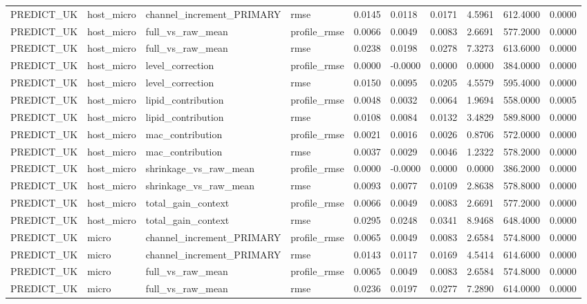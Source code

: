 {\begin{longtable}{llllllllll}
PREDICT\_UK & host\_micro & channel\_increment\_PRIMARY & rmse & 0.0145 & 0.0118 & 0.0171 & 4.5961 & 612.4000 & 0.0000 \\
PREDICT\_UK & host\_micro & full\_vs\_raw\_mean & profile\_rmse & 0.0066 & 0.0049 & 0.0083 & 2.6691 & 577.2000 & 0.0000 \\
PREDICT\_UK & host\_micro & full\_vs\_raw\_mean & rmse & 0.0238 & 0.0198 & 0.0278 & 7.3273 & 613.6000 & 0.0000 \\
PREDICT\_UK & host\_micro & level\_correction & profile\_rmse & 0.0000 & -0.0000 & 0.0000 & 0.0000 & 384.0000 & 0.0000 \\
PREDICT\_UK & host\_micro & level\_correction & rmse & 0.0150 & 0.0095 & 0.0205 & 4.5579 & 595.4000 & 0.0000 \\
PREDICT\_UK & host\_micro & lipid\_contribution & profile\_rmse & 0.0048 & 0.0032 & 0.0064 & 1.9694 & 558.0000 & 0.0005 \\
PREDICT\_UK & host\_micro & lipid\_contribution & rmse & 0.0108 & 0.0084 & 0.0132 & 3.4829 & 589.8000 & 0.0000 \\
PREDICT\_UK & host\_micro & mac\_contribution & profile\_rmse & 0.0021 & 0.0016 & 0.0026 & 0.8706 & 572.0000 & 0.0000 \\
PREDICT\_UK & host\_micro & mac\_contribution & rmse & 0.0037 & 0.0029 & 0.0046 & 1.2322 & 578.2000 & 0.0000 \\
PREDICT\_UK & host\_micro & shrinkage\_vs\_raw\_mean & profile\_rmse & 0.0000 & -0.0000 & 0.0000 & 0.0000 & 386.2000 & 0.0000 \\
PREDICT\_UK & host\_micro & shrinkage\_vs\_raw\_mean & rmse & 0.0093 & 0.0077 & 0.0109 & 2.8638 & 578.8000 & 0.0000 \\
PREDICT\_UK & host\_micro & total\_gain\_context & profile\_rmse & 0.0066 & 0.0049 & 0.0083 & 2.6691 & 577.2000 & 0.0000 \\
PREDICT\_UK & host\_micro & total\_gain\_context & rmse & 0.0295 & 0.0248 & 0.0341 & 8.9468 & 648.4000 & 0.0000 \\
PREDICT\_UK & micro & channel\_increment\_PRIMARY & profile\_rmse & 0.0065 & 0.0049 & 0.0083 & 2.6584 & 574.8000 & 0.0000 \\
PREDICT\_UK & micro & channel\_increment\_PRIMARY & rmse & 0.0143 & 0.0117 & 0.0169 & 4.5414 & 614.6000 & 0.0000 \\
PREDICT\_UK & micro & full\_vs\_raw\_mean & profile\_rmse & 0.0065 & 0.0049 & 0.0083 & 2.6584 & 574.8000 & 0.0000 \\
PREDICT\_UK & micro & full\_vs\_raw\_mean & rmse & 0.0236 & 0.0197 & 0.0277 & 7.2890 & 614.0000 & 0.0000 \\

\end{longtable}}
